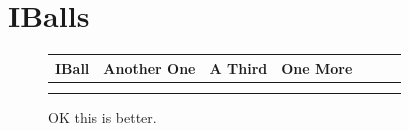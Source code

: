 \section{IBalls}

\begin{figure}[H]
  {
    \setlength{\tabcolsep}{1.0pt}
    \setlength\cmidrulewidth{\heavyrulewidth} %
    \begin{adjustbox}{width=14cm,center}
      \begin{tabular}{ccccccc}
        \toprule
        IBall & Another One & A Third & One More & \\
        \midrule
        \midrule
\makecell[l]{
	\begin{subfigure}{0.3\textwidth}
    \def\MULTICOLORONE{gray}
    \def\MULTICOLORTWO{white}
    \def\SPRITECOLOR{black}
		
	\end{subfigure}
} & 
\makecell[l]{
	\begin{subfigure}{0.3\textwidth}
    \def\MULTICOLORONE{gray}
    \def\MULTICOLORTWO{white}
    \def\SPRITECOLOR{black}
		
	\end{subfigure}
} & 
\makecell[l]{
	\begin{subfigure}{0.3\textwidth}
    \def\MULTICOLORONE{gray}
    \def\MULTICOLORTWO{white}
    \def\SPRITECOLOR{black}
		
	\end{subfigure}
} & 
\makecell[l]{
	\begin{subfigure}{0.3\textwidth}
    \def\MULTICOLORONE{gray}
    \def\MULTICOLORTWO{white}
    \def\SPRITECOLOR{black}
		
	\end{subfigure}
} \\ 
        \addlinespace
        \bottomrule
      \end{tabular}
    \end{adjustbox}
  }\caption{OK this is better.}
\end{figure}


